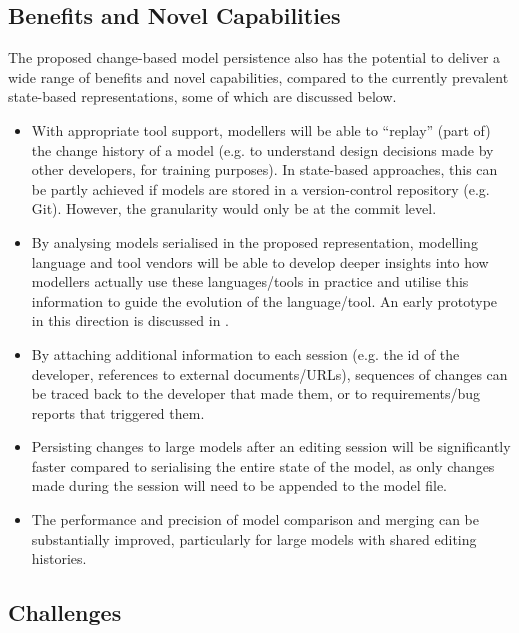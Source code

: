 \subsection{Benefits and Novel Capabilities}
\label{sec:benefits_and_novel_capabilities}

The proposed change-based model persistence also has the potential to deliver a wide range of benefits and novel capabilities, compared to the currently prevalent state-based representations, some of which are discussed below.

\begin{itemize}
  \item With appropriate tool support, modellers will be able to ``replay'' (part of) the change history of a model (e.g. to understand design decisions made by other developers, for training purposes). In state-based approaches, this can be partly achieved if models are stored in a version-control repository (e.g. Git). However, the granularity would only be at the commit level.
  \item By analysing models serialised in the proposed representation, modelling language and tool vendors will be able to develop deeper insights into how modellers actually use these languages/tools in practice and utilise this information to guide the evolution of the language/tool. An early prototype in this direction is discussed in \cite{polack2019towards}.
  \item By attaching additional information to each session (e.g. the id of the developer, references to external documents/URLs), sequences of changes can be traced back to the developer that made them, or to requirements/bug reports that triggered them.
  \item Persisting changes to large models after an editing session will be significantly faster compared to serialising the entire state of the model, as only changes made during the session will need to be appended to the model file.
  \item The performance and precision of model comparison and merging can be substantially improved, particularly for large models with shared editing histories.
\end{itemize}

\subsection{Challenges}
\label{sec:challenges}


